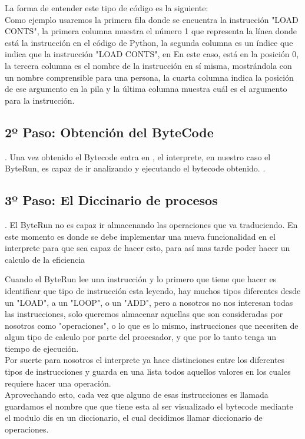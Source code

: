 La forma de entender este tipo de código es la siguiente:\\

Como ejemplo usaremos la primera fila donde se encuentra la instrucción "LOAD CONTS", la primera columna muestra el número 1 que representa la línea donde está la instrucción en el código de Python, la segunda columna es un índice que indica que la instrucción "LOAD CONTS", en En este caso, está en la posición 0, la tercera columna es el nombre de la instrucción en sí misma, mostrándola con un nombre comprensible para una persona, la cuarta columna indica la posición de ese argumento en la pila y la última columna muestra cuál es el argumento para la instrucción.\\

\subsection{2º Paso: Obtención del ByteCode}.
Una vez obtenido el Bytecode entra en , el interprete, en nuestro caso el ByteRun, es capaz de ir analizando y ejecutando el bytecode obtenido. .

\subsection{3º Paso: El Diccinario de procesos}.
El ByteRun no es capaz ir almacenando las operaciones que va traduciendo. En este momento es donde se debe implementar una nueva funcionalidad en el interprete para que sea capaz de hacer esto, para así mas tarde poder hacer un calculo de la eficiencia

Cuando el ByteRun lee una instrucción y lo primero que tiene que hacer es identificar que tipo de instrucción esta leyendo, hay muchos tipos diferentes desde un "LOAD", a un "LOOP", o un "ADD", pero a nosotros no nos interesan todas las instrucciones, solo queremos almacenar aquellas que son consideradas por nosotros como "operaciones", o lo que es lo mismo, instrucciones que necesiten de algun tipo de calculo por parte del procesador, y que por lo tanto tenga un tiempo de ejecución.\\

Por suerte para nosotros el interprete ya hace distinciones entre los diferentes tipos de instrucciones y guarda en una lista todos aquellos valores en los cuales requiere hacer una operación.\\

Aprovechando esto, cada vez que alguno de esas instrucciones es llamada guardamos el nombre que que tiene esta al ser visualizado el bytecode mediante el modulo dis en un diccionario, el cual decidimos llamar diccionario de operaciones.\\

